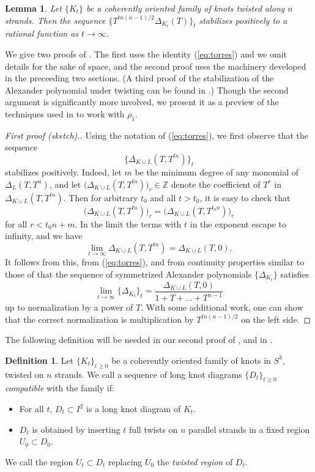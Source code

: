 \documentclass[11pt,hyp,]{nyjm}
\newcommand{\Z}{\mathbb{Z}}
\numberwithin{thm}{section}
\newtheorem{lemma}[thm]{Lemma}
\theoremstyle{definition}
\newtheorem{defn}[thm]{Definition}
\theoremstyle{remark}
\begin{document}
	\begin{lemma}
		\label{lem:alex}
		Let $\{K_t\}$ be a coherently oriented family of knots twisted along $n$ strands. Then the sequence $\{T^{tn(n -1)/2}\Delta_{K_t}(T)\}_t$ stabilizes positively to a rational function as $t \to \infty$.
	\end{lemma}
	
	We give two proofs of . The first uses the identity (\ref{eq:torres}) and we omit details for the sake of space, and the second proof uses the machinery developed in the preceeding two sections. (A third proof of the stabilization of the Alexander polynomial under twisting can be found in \cite{che22}.) Though the second argument is significantly more involved, we present it as a preview of the techniques used in  to work with $\rho_1$.
	
	\begin{proof}[First proof (sketch).]
		Using the notation of (\ref{eq:torres}), we first observe that the sequence
		$$
		\{\Delta_{K \cup L}(T,T^{tn})\}_t
		$$
		stabilizes positively. Indeed, let $m$ be the minimum degree of any monomial of $\Delta_L(T,T^n)$, and let $\big( \Delta_{K \cup L}(T,T^{tn}) \big)_r \in \Z$ denote the coefficient of $T^r$ in $\Delta_{K \cup L}(T,T^{tn})$. Then for arbitrary $t_0$ and all $t > t_0$, it is easy to check that
		$$
		\big( \Delta_{K \cup L}(T,T^{tn}) \big)_r = \big( \Delta_{K \cup L}(T,T^{t_0n}) \big)_r
		$$
		for all $r < t_0n + m$. In the limit the terms with $t$ in the exponent escape to infinity, and we have
		$$
		\lim_{t \to \infty} \Delta_{K \cup L}(T,T^{tn}) = \Delta_{K \cup L}(T,0).
		$$
		It follows from this, from (\ref{eq:torres}), and from continuity properties similar to those of  that the sequence of symmetrized Alexander polynomials $\{\Delta_{K_t}\}$ satisfies
		\begin{equation}
			\label{eq:easy}
			\lim_{t \to \infty} \{\Delta_{K_t}\}_t = \frac{\Delta_{K \cup L}(T,0)}{1 + T + \dots + T^{n - 1}}
		\end{equation}
		up to normalization by a power of $T$. With some additional work, one can show that the correct normalization is multiplication by $T^{tn(n -1)/2}$ on the left side.
	\end{proof}
	
	The following definition will be needed in our second proof of , and in .
	
	\begin{defn}
		\label{def:compat}
		Let $\{K_t\}_{t \geq 0}$ be a coherently oriented family of knots in $S^3$, twisted on $n$ strands. We call a sequence of long knot diagrams $\{D_t\}_{t \geq 0}$ {\em compatible} with the family if:
		\begin{itemize}
			\item For all $t$, $D_t \subset I^2$ is a long knot diagram of $K_t$.
			\item $D_t$ is obtained by inserting $t$ full twists on $n$ parallel strands in a fixed region $U_0 \subset D_0$.
		\end{itemize}
		We call the region $U_t \subset D_t$ replacing $U_0$ the {\em twisted region} of $D_t$.
	\end{defn}
\end{document}
